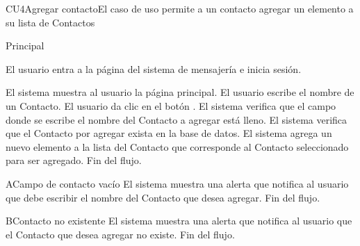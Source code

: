 
% 



	

	\begin{UseCase}{CU4}{Agregar contacto}{El caso de uso permite a un contacto agregar un elemento a su lista de Contactos}
	\end{UseCase}

	\begin{UCtrayectoria}{Principal}
	
			\UCpaso[\UCactor] El usuario entra a la p\'agina del sistema de mensajer\'ia e inicia sesi\'on.

		\UCpaso El sistema muestra al usuario la p\'agina principal.
		\UCpaso[\UCactor] El usuario escribe el nombre de un Contacto.
		\UCpaso[\UCactor] El usuario da clic en el bot\'on .
		\UCpaso El sistema verifica que el campo donde se escribe el nombre del Contacto a agregar est\'a lleno.
		\UCpaso El sistema verifica que el Contacto por agregar exista en la base de datos.
		\UCpaso El sistema agrega un nuevo elemento a la lista del Contacto que corresponde al Contacto seleccionado para ser agregado.
		\UCpaso[] Fin del flujo.
				
	\end{UCtrayectoria}
		
		\begin{UCtrayectoriaA}{A}{Campo de contacto vac\'io}
			\UCpaso El sistema muestra una alerta que notifica al usuario que debe escribir el nombre del Contacto que desea agregar.
			\UCpaso[] Fin del flujo.
		\end{UCtrayectoriaA}

		\begin{UCtrayectoriaA}{B}{Contacto no existente}
			\UCpaso El sistema muestra una alerta que notifica al usuario que el Contacto que desea agregar no existe.			\UCpaso[] Fin del flujo.
		\end{UCtrayectoriaA}

		
